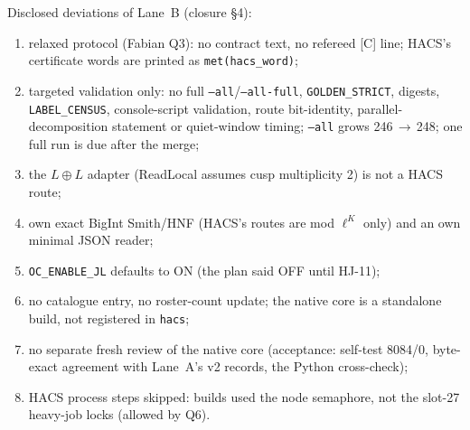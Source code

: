 Disclosed deviations of Lane~B (closure \S4):
\begin{enumerate}[label=D\arabic*,leftmargin=2.2em]
\item relaxed protocol (Fabian Q3): no contract text, no refereed [C] line; HACS's certificate words are printed as \texttt{met(hacs\_word)};
\item targeted validation only: no full \texttt{--all}/\texttt{--all-full}, \texttt{GOLDEN\_STRICT}, digests, \texttt{LABEL\_CENSUS},
  console-script validation, route bit-identity, parallel-decomposition statement or quiet-window timing; \texttt{--all} grows
  246\,$\to$\,248; one full run is due after the merge;
\item the $L\oplus L$ adapter (ReadLocal assumes cusp multiplicity 2) is not a HACS route;
\item own exact BigInt Smith/HNF (HACS's routes are mod $\ell^K$ only) and an own minimal JSON reader;
\item \texttt{OC\_ENABLE\_JL} defaults to ON (the plan said OFF until HJ-11);
\item no catalogue entry, no roster-count update; the native core is a standalone build, not registered in \texttt{hacs};
\item no separate fresh review of the native core (acceptance: self-test 8084/0, byte-exact agreement with Lane~A's v2 records,
  the Python cross-check);
\item HACS process steps skipped: builds used the node semaphore, not the slot-27 heavy-job locks (allowed by Q6).
\end{enumerate}
